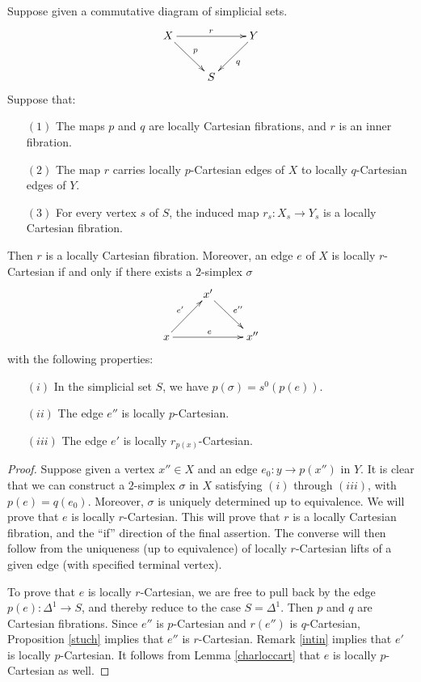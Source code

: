 \begin{proposition}\label{fibertest}
Suppose given a commutative diagram of simplicial sets.
$$ \xymatrix{ X \ar[dr]^{p} \ar[rr]^{r} & & Y \ar[dl]^{q} \\
& S & }$$
Suppose that:
\begin{itemize}
\item[$(1)$] The maps $p$ and $q$ are locally Cartesian fibrations, and $r$ is an inner fibration.
\item[$(2)$] The map $r$ carries locally $p$-Cartesian edges of $X$ to locally $q$-Cartesian edges of $Y$.
\item[$(3)$] For every vertex $s$ of $S$, the induced map $r_{s}: X_{s} \rightarrow Y_{s}$ is a
locally Cartesian fibration.
\end{itemize}
Then $r$ is a locally Cartesian fibration. Moreover, an edge $e$ of $X$ is locally $r$-Cartesian if and only if there exists a $2$-simplex $\sigma$
$$ \xymatrix{ & x' \ar[dr]^{e''} & \\
x \ar[ur]^{e'} \ar[rr]^{e} & & x'' }$$
with the following properties:
\begin{itemize}
\item[$(i)$] In the simplicial set $S$, we have $p( \sigma) = s^0( p(e))$.
\item[$(ii)$] The edge $e''$ is locally $p$-Cartesian.
\item[$(iii)$] The edge $e'$ is locally $r_{p(x)}$-Cartesian.
\end{itemize}
\end{proposition}

\begin{proof}
Suppose given a vertex $x'' \in X$ and an edge $e_0: y \rightarrow p(x'')$ in $Y$. It is clear that we can construct a $2$-simplex $\sigma$ in $X$ satisfying $(i)$ through $(iii)$, with
$p(e) = q(e_0)$. Moreover, $\sigma$ is uniquely determined up to equivalence. We will prove that $e$ is locally $r$-Cartesian. This will prove that $r$ is a locally Cartesian fibration, and the
``if'' direction of the final assertion. The converse will then follow from the uniqueness (up to equivalence) of locally $r$-Cartesian lifts of a given edge (with specified terminal vertex).
 
To prove that $e$ is locally $r$-Cartesian, we are free to pull back by the edge
$p(e): \Delta^1 \rightarrow S$, and thereby reduce to the case $S = \Delta^1$. Then
$p$ and $q$ are Cartesian fibrations. Since $e''$ is $p$-Cartesian and $r(e'')$ is $q$-Cartesian, Proposition \ref{stuch} implies that $e''$ is $r$-Cartesian. Remark \ref{intin} implies that
$e'$ is locally $p$-Cartesian. It follows from Lemma \ref{charloccart} that $e$ is locally $p$-Cartesian as well.
\end{proof}

